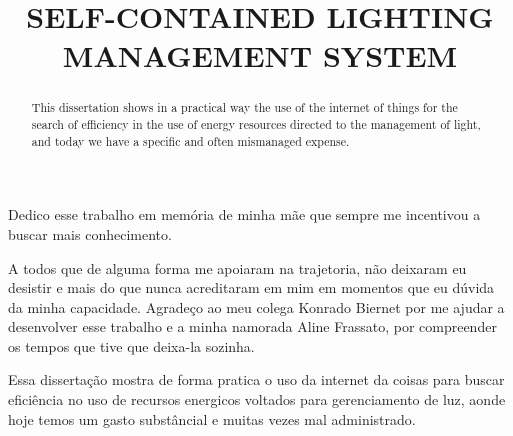\documentclass[openright]{normas-utf-tex} %
\title{\MakeUppercase{Self-contained lighting management system}} %
\begin{document}
\capa %
\folhaderosto %

\fichacatpgbib{\pageref{bibstart}-\pageref{bibend}}
\fichacat



\begin{dedicatoria}
Dedico esse trabalho em memória de minha mãe que sempre me incentivou a buscar mais conhecimento.
\end{dedicatoria}

\begin{agradecimentos}
A todos que de alguma forma me apoiaram na trajetoria, não deixaram eu desistir e mais do que nunca acreditaram em mim em momentos que eu dúvida da minha capacidade.
Agradeço ao meu colega Konrado Biernet por me ajudar a desenvolver esse trabalho e a minha namorada Aline Frassato, por compreender os tempos que tive que deixa-la sozinha.
\end{agradecimentos}

\begin{resumo}
Essa dissertação mostra de forma pratica o uso da internet da coisas para buscar eficiência no uso de recursos energicos voltados para gerenciamento de luz, aonde hoje temos um gasto substâncial e muitas vezes mal administrado.
\end{resumo}

\begin{abstract}
This dissertation shows in a practical way the use of the internet of things for the search of efficiency in the use of energy resources directed to the management of light, and today we have a specific and often mismanaged expense.
\end{abstract}

\listadefiguras %
\listadesiglas


\sumario %
\end{document}
